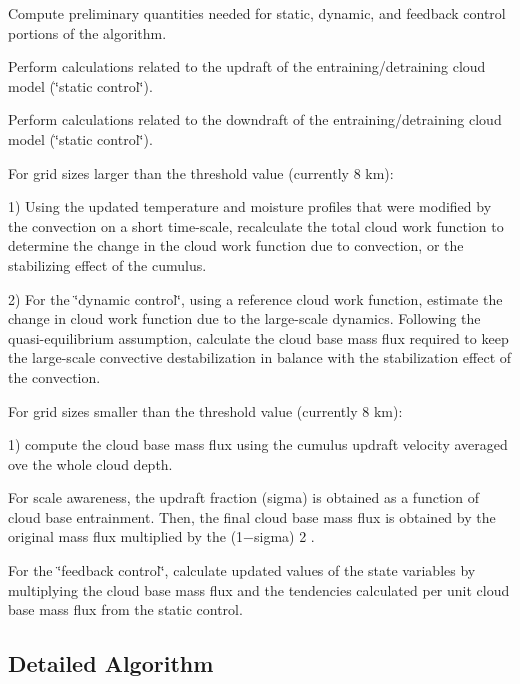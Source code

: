 \begin{DoxyEnumerate}
\item Compute preliminary quantities needed for static, dynamic, and feedback control portions of the algorithm.
\item Perform calculations related to the updraft of the entraining/detraining cloud model (\char`\"{}static control\char`\"{}).
\item Perform calculations related to the downdraft of the entraining/detraining cloud model (\char`\"{}static control\char`\"{}).
\item For grid sizes larger than the threshold value (currently 8 km)\+:
\begin{DoxyItemize}
\item 1) Using the updated temperature and moisture profiles that were modified by the convection on a short time-\/scale, recalculate the total cloud work function to determine the change in the cloud work function due to convection, or the stabilizing effect of the cumulus.
\item 2) For the \char`\"{}dynamic control\char`\"{}, using a reference cloud work function, estimate the change in cloud work function due to the large-\/scale dynamics. Following the quasi-\/equilibrium assumption, calculate the cloud base mass flux required to keep the large-\/scale convective destabilization in balance with the stabilization effect of the convection.
\end{DoxyItemize}
\item For grid sizes smaller than the threshold value (currently 8 km)\+:
\begin{DoxyItemize}
\item 1) compute the cloud base mass flux using the cumulus updraft velocity averaged ove the whole cloud depth.
\end{DoxyItemize}
\item For scale awareness, the updraft fraction (sigma) is obtained as a function of cloud base entrainment. Then, the final cloud base mass flux is obtained by the original mass flux multiplied by the (1−sigma) 2 .
\item For the \char`\"{}feedback control\char`\"{}, calculate updated values of the state variables by multiplying the cloud base mass flux and the tendencies calculated per unit cloud base mass flux from the static control.
\end{DoxyEnumerate}\hypertarget{group___g_f_s___n_s_s_t_detailed}{}\subsection{Detailed Algorithm}\label{group___g_f_s___n_s_s_t_detailed}
